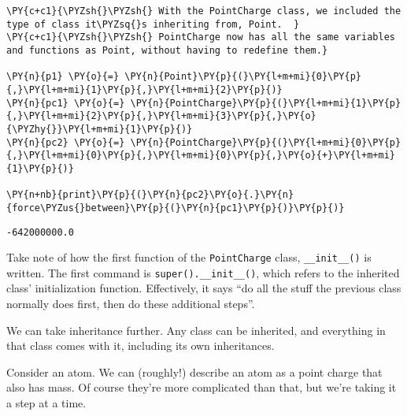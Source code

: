 \begin{tcolorbox}[breakable, size=fbox, boxrule=1pt, pad at break*=1mm,colback=cellbackground, colframe=cellborder]
\begin{Verbatim}[commandchars=\\\{\}]
\PY{c+c1}{\PYZsh{}\PYZsh{} With the PointCharge class, we included the type of class it\PYZsq{}s inheriting from, Point.  }
\PY{c+c1}{\PYZsh{}\PYZsh{} PointCharge now has all the same variables and functions as Point, without having to redefine them.}

\PY{n}{p1} \PY{o}{=} \PY{n}{Point}\PY{p}{(}\PY{l+m+mi}{0}\PY{p}{,}\PY{l+m+mi}{1}\PY{p}{,}\PY{l+m+mi}{2}\PY{p}{)}
\PY{n}{pc1} \PY{o}{=} \PY{n}{PointCharge}\PY{p}{(}\PY{l+m+mi}{1}\PY{p}{,}\PY{l+m+mi}{2}\PY{p}{,}\PY{l+m+mi}{3}\PY{p}{,}\PY{o}{\PYZhy{}}\PY{l+m+mi}{1}\PY{p}{)}
\PY{n}{pc2} \PY{o}{=} \PY{n}{PointCharge}\PY{p}{(}\PY{l+m+mi}{0}\PY{p}{,}\PY{l+m+mi}{0}\PY{p}{,}\PY{l+m+mi}{0}\PY{p}{,}\PY{o}{+}\PY{l+m+mi}{1}\PY{p}{)}

\PY{n+nb}{print}\PY{p}{(}\PY{n}{pc2}\PY{o}{.}\PY{n}{force\PYZus{}between}\PY{p}{(}\PY{n}{pc1}\PY{p}{)}\PY{p}{)}
\end{Verbatim}
\end{tcolorbox}

    \begin{Verbatim}[commandchars=\\\{\}]
-642000000.0
    \end{Verbatim}

    Take note of how the first function of the \texttt{PointCharge} class,
\texttt{\_\_init\_\_()} is written. The first command is
\texttt{super().\_\_init\_\_()}, which refers to the inherited class'
initialization function. Effectively, it says ``do all the stuff the
previous class normally does first, then do these additional steps''.

We can take inheritance further. Any class can be inherited, and
everything in that class comes with it, including its own inheritances.

Consider an atom. We can (roughly!) describe an atom as a point charge
that also has mass. Of course they're more complicated than that, but
we're taking it a step at a time.

